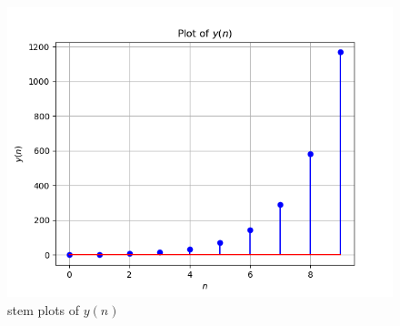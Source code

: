\documentclass[journal,12pt,onecolumn]{IEEEtran}
\theoremstyle{remark}
\begin{document}
\begin{figure}[h!]
    \centering
    \includegraphics[width=\columnwidth]{figs/plot.png}
    \caption{stem plots of $y(n)$}
    \label{fig:2}
\end{figure}
\end{document}
